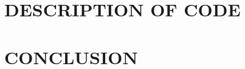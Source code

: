 \documentclass[10pt,twocolumn]{witseiepaper}
\begin{document}
\section{DESCRIPTION OF CODE}


\section{CONCLUSION}



\begin{thebibliography}{1}

\end{thebibliography}




\clearpage
\onecolumn
\appendix
\end{document}
